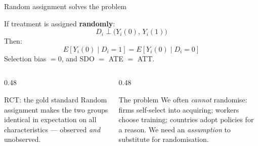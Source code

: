 \documentclass[aspectratio=169, 10pt]{beamer}
\begin{document}
\begin{frame}{Random assignment solves the problem}

  If treatment is assigned \textbf{randomly}:
  \[
    D_i \perp \bigl(Y_i(0),\, Y_i(1)\bigr)
  \]
  Then:
  \[
    E[Y_i(0)\mid D_i=1] = E[Y_i(0)\mid D_i=0]
  \]
  Selection bias $= 0$, and SDO $=$ ATE $=$ ATT.

  \bigskip
  \begin{columns}[T]
    \begin{column}{0.48\textwidth}
      \begin{exampleblock}{RCT: the gold standard}
        Random assignment makes the two groups identical in expectation on all characteristics — observed \emph{and} unobserved.
      \end{exampleblock}
    \end{column}
    \begin{column}{0.48\textwidth}
      \begin{alertblock}{The problem}
        We often \emph{cannot} randomise:
        firms self-select into acquiring; workers choose training; countries adopt policies for a reason.
        We need an \emph{assumption} to substitute for randomisation.
      \end{alertblock}
    \end{column}
  \end{columns}
\end{frame}

\end{document}
